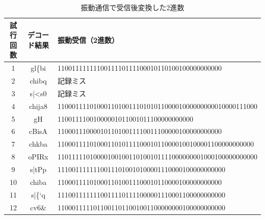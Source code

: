 \begin{table}[htbp]
    \centering
    \caption{振動通信で受信後変換した2進数}
    \label{table:result3}
    \begin{tabular}{|c|c|p{10cm}|} \hline
        試行回数  &デコード結果 &振動受信（2進数） \\ \hline
        1   &gl\{bi &1100111111110011110111100010110100100000000000  \\ \hline
        2   &chibq  &記録ミス \\ \hline
        3   &s|<s0  &記録ミス  \\ \hline
        4   &chija8 &11000111101000110100111010101100001000000000010000111000 \newline
                     00000001000100000000000 \\ \hline
        5   &gH     &11001111001000001011001011100000000000     \\ \hline
        6   &cBisA  &1100011100001011010011110011100000100000000000  \\ \hline
        7   &chkba  &1100011110100011010111100010110000100100001100000000000  \\ \hline
        8   &oPIRx  &11011111010000100100110100101111000000001000100000000000  \\ \hline
        9   &s|tPp  &11100111111100111010010100001110000100000000000  \\ \hline
        10  &chiba  &1100011110100011010011100010110000100000000000  \\ \hline
        11  &s|\{`q &11100111111100111101111000001110001100000000000  \\ \hline
        12  &cv6\&  &11000111110110011011001001100000000100000000000  \\ \hline
    \end{tabular}
\end{table}




\clearpage